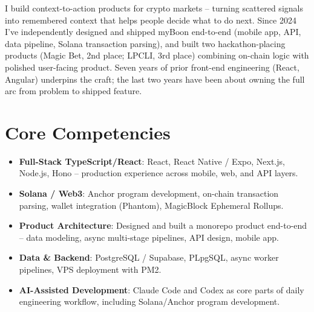 \documentclass[11pt,a4paper,sans]{moderncv}
\begin{document}
\makecvtitle


\vspace{6pt}
\small{I build context-to-action products for crypto markets -- turning scattered signals into remembered context that helps people decide what to do next. Since 2024 I've independently designed and shipped myBoon end-to-end (mobile app, API, data pipeline, Solana transaction parsing), and built two hackathon-placing products (Magic Bet, 2nd place; LPCLI, 3rd place) combining on-chain logic with polished user-facing product. Seven years of prior front-end engineering (React, Angular) underpins the craft; the last two years have been about owning the full arc from problem to shipped feature.}


\section{Core Competencies}
\vspace{1pt}
\begin{itemize}

\item \textbf{Full-Stack TypeScript/React}: React, React Native / Expo, Next.js, Node.js, Hono -- production experience across mobile, web, and API layers.

\item \textbf{Solana / Web3}: Anchor program development, on-chain transaction parsing, wallet integration (Phantom), MagicBlock Ephemeral Rollups.

\item \textbf{Product Architecture}: Designed and built a monorepo product end-to-end -- data modeling, async multi-stage pipelines, API design, mobile app.

\item \textbf{Data \& Backend}: PostgreSQL / Supabase, PLpgSQL, async worker pipelines, VPS deployment with PM2.

\item \textbf{AI-Assisted Development}: Claude Code and Codex as core parts of daily engineering workflow, including Solana/Anchor program development.

\end{itemize}
\end{document}
